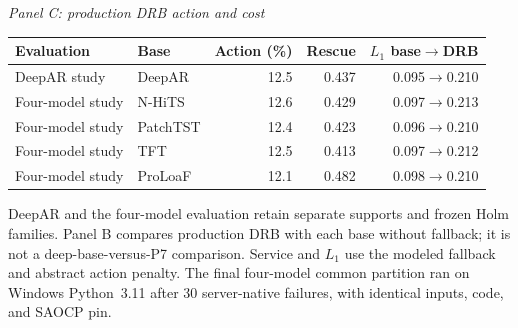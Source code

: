 \begin{table}[p]
\vspace{6pt}
\textit{Panel C: production DRB action and cost}\\[2pt]
\begin{tabular}{llrrr}
\toprule
Evaluation & Base & Action (\%) & Rescue & $L_1$ base$\to$DRB \\
\midrule
DeepAR study & DeepAR & 12.5 & 0.437 & 0.095$\to$0.210 \\
Four-model study & N-HiTS & 12.6 & 0.429 & 0.097$\to$0.213 \\
Four-model study & PatchTST & 12.4 & 0.423 & 0.096$\to$0.210 \\
Four-model study & TFT & 12.5 & 0.413 & 0.097$\to$0.212 \\
Four-model study & ProLoaF & 12.1 & 0.482 & 0.098$\to$0.210 \\
\bottomrule
\end{tabular}
\par\footnotesize DeepAR and the four-model evaluation retain separate supports and frozen Holm families. Panel B compares production DRB with each base without fallback; it is not a deep-base-versus-P7 comparison. Service and $L_1$ use the modeled fallback and abstract action penalty. The final four-model common partition ran on Windows Python~3.11 after 30 server-native failures, with identical inputs, code, and SAOCP pin.
\end{table}
